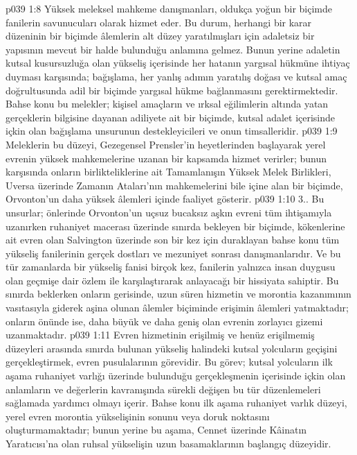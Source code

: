 \vs p039 1:8 Yüksek meleksel mahkeme danışmanları, oldukça yoğun bir biçimde fanilerin savunucuları olarak hizmet eder. Bu durum, herhangi bir karar düzeninin bir biçimde âlemlerin alt düzey yaratılmışları için adaletsiz bir yapısının mevcut bir halde bulunduğu anlamına gelmez. Bunun yerine adaletin kutsal kusursuzluğa olan yükseliş içerisinde her hatanın yargısal hükmüne ihtiyaç duyması karşısında; bağışlama, her yanlış adımın yaratılış doğası ve kutsal amaç doğrultusunda adil bir biçimde yargısal hükme bağlanmasını gerektirmektedir. Bahse konu bu melekler; kişisel amaçların ve ırksal eğilimlerin altında yatan gerçeklerin bilgisine dayanan adiliyete ait bir biçimde, kutsal adalet içerisinde içkin olan bağışlama unsurunun destekleyicileri ve onun timsalleridir.
\vs p039 1:9 Meleklerin bu düzeyi, Gezegensel Prensler’in heyetlerinden başlayarak yerel evrenin yüksek mahkemelerine uzanan bir kapsamda hizmet verirler; bunun karşısında onların birlikteliklerine ait Tamamlanışın Yüksek Melek Birlikleri, Uversa üzerinde Zamanın Ataları’nın mahkemelerini bile içine alan bir biçimde, Orvonton’un daha yüksek âlemleri içinde faaliyet gösterir.
\vs p039 1:10 3.\bibnobreakspace {}. Bu unsurlar; önlerinde Orvonton’un uçsuz bucaksız aşkın evreni tüm ihtişamıyla uzanırken ruhaniyet macerası üzerinde sınırda bekleyen bir biçimde, kökenlerine ait evren olan Salvington üzerinde son bir kez için duraklayan bahse konu tüm yükseliş fanilerinin gerçek dostları ve mezuniyet sonrası danışmanlarıdır. Ve bu tür zamanlarda bir yükseliş fanisi birçok kez, fanilerin yalnızca insan duygusu olan geçmişe dair özlem ile karşılaştırarak anlayacağı bir hissiyata sahiptir. Bu sınırda beklerken onların gerisinde, uzun süren hizmetin ve morontia kazanımının vasıtasıyla giderek aşina olunan âlemler biçiminde erişimin âlemleri yatmaktadır; onların önünde ise, daha büyük ve daha geniş olan evrenin zorlayıcı gizemi uzanmaktadır.
\vs p039 1:11 Evren hizmetinin erişilmiş ve henüz erişilmemiş düzeyleri arasında sınırda bulunan yükseliş halindeki kutsal yolcuların geçişini gerçekleştirmek, evren pusulalarının görevidir. Bu görev; kutsal yolcuların ilk aşama ruhaniyet varlığı üzerinde bulunduğu gerçekleşmenin içerisinde içkin olan anlamların ve değerlerin kavranışında sürekli değişen bu tür düzenlemeleri sağlamada yardımcı olmayı içerir. Bahse konu ilk aşama ruhaniyet varlık düzeyi, yerel evren morontia yükselişinin sonunu veya doruk noktasını oluşturmamaktadır; bunun yerine bu aşama, Cennet üzerinde Kâinatın Yaratıcısı’na olan ruhsal yükselişin uzun basamaklarının başlangıç düzeyidir.
